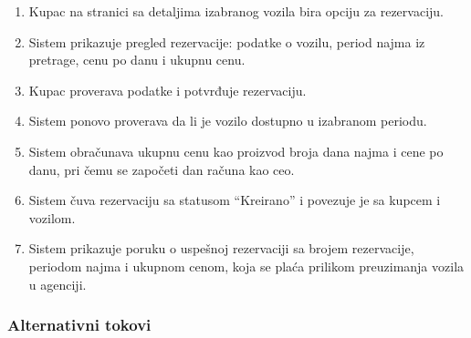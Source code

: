 \documentclass[a4paper,12pt]{article}
\begin{document}
\begin{enumerate}
    \item Kupac na stranici sa detaljima izabranog vozila bira opciju za rezervaciju.
    \item Sistem prikazuje pregled rezervacije: podatke o vozilu, period najma iz pretrage, cenu po danu i ukupnu cenu.
    \item Kupac proverava podatke i potvrđuje rezervaciju.
    \item Sistem ponovo proverava da li je vozilo dostupno u izabranom periodu.
    \item Sistem obračunava ukupnu cenu kao proizvod broja dana najma i cene po danu, pri čemu se započeti dan računa kao ceo.
    \item Sistem čuva rezervaciju sa statusom \enquote{Kreirano} i povezuje je sa kupcem i vozilom.
    \item Sistem prikazuje poruku o uspešnoj rezervaciji sa brojem rezervacije, periodom najma i ukupnom cenom, koja se plaća prilikom preuzimanja vozila u agenciji.
\end{enumerate}

\subsubsection{Alternativni tokovi}
\end{document}

